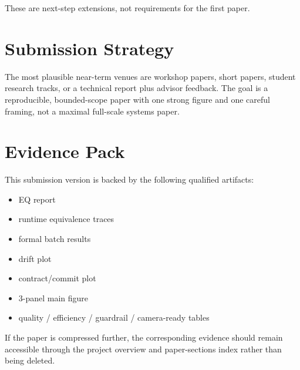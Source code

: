 \documentclass[11pt]{article}
\begin{document}
These are next-step extensions, not requirements for the first paper.

\section{Submission Strategy}
The most plausible near-term venues are workshop papers, short papers, student research tracks, or a technical report plus advisor feedback. The goal is a reproducible, bounded-scope paper with one strong figure and one careful framing, not a maximal full-scale systems paper.

\section{Evidence Pack}
This submission version is backed by the following qualified artifacts:
\begin{itemize}[leftmargin=*]
  \item EQ report
  \item runtime equivalence traces
  \item formal batch results
  \item drift plot
  \item contract/commit plot
  \item 3-panel main figure
  \item quality / efficiency / guardrail / camera-ready tables
\end{itemize}

If the paper is compressed further, the corresponding evidence should remain accessible through the project overview and paper-sections index rather than being deleted.

\nocite{*}

\end{document}
